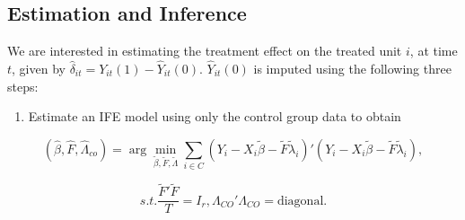 \documentclass[12pt,nobind, a4paper]{reedthesis}
\providecommand{\tightlist}{%
	\setlength{\itemsep}{0pt}\setlength{\parskip}{0pt}}
\begin{document}
 \hypertarget{estimation-and-inference}{%
 \subsection{Estimation and Inference}\label{estimation-and-inference}}

 We are interested in estimating the treatment effect on the treated unit \(i\), at time \(t\), given by \(\hat{\delta}_{it}= Y_{it}(1)-\hat{Y}_{it}(0)\). \(\hat{Y}_{it}(0)\) is imputed using the following three steps:
 \linebreak
 \begin{enumerate}
 \def\labelenumi{\arabic{enumi}.}
 \tightlist
 \item
   Estimate an IFE model using only the control group data to obtain
 \end{enumerate}
 \[(\hat{\beta},\hat{F},\hat{\Lambda}_{co})=\arg\min_{\tilde{\beta},\tilde{F},\tilde{\Lambda}}\sum_{i\in C}(Y_{i}-X_{i} \tilde{\beta}-\tilde{F}\tilde{\lambda}_{i})'(Y_{i}-X_{i}\tilde{\beta}-\tilde{F}\tilde{\lambda}_{i}),\]

 \[s.t. \frac{\tilde{F}'\tilde{F}}{T}=I_{r}
 , \Lambda_{CO}'\Lambda_{CO}=\text{diagonal}.\]
\end{document}
